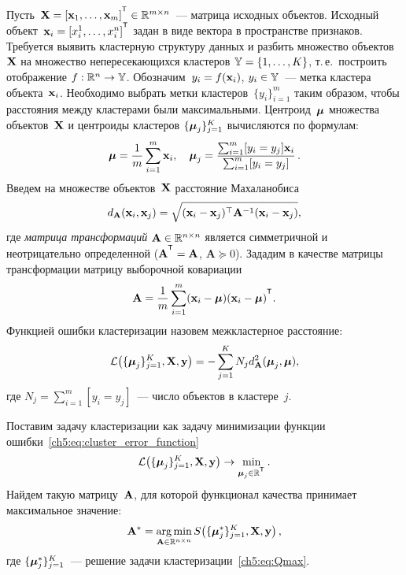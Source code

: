\documentclass[11pt, a5paper]{dissert}
\begin{document}
Пусть~$\bX = [\bx_1, \dots, \bx_m]^{\T} \in \mathbb{R}^{m \times n}$~--- матрица исходных объектов.
Исходный объект~$\bx_i = [x_i^1, \ldots, x_i^n]^{\T}$ задан в виде вектора в пространстве признаков.
Требуется выявить кластерную структуру данных и разбить множество объектов~$\mathbf{X}$ на множество непересекающихся кластеров $\mathbb{Y} = \{1, \dots, K\}$,
т.\,е.\ построить отображение $f: \mathbb{R}^n \to \mathbb{Y}$.
Обозначим~$y_i = f (\mathbf{x}_i)$, $y_i \in \mathbb{Y}$~--- метка кластера объекта~$\mathbf{x}_i$.
Необходимо выбрать метки кластеров~$\{y_i\}_{i=1}^m$ таким образом, чтобы расстояния между кластерами были максимальными.
Центроид~$\boldsymbol{\mu}$ множества объектов~$\mathbf{X}$ и центроиды кластеров $\{\boldsymbol{\mu}_j\}_{j=1}^K$ вычисляются по формулам:
\begin{equation}
	\label{ch5:eq:mu}
	\boldsymbol{\mu} =\frac{1}{m} \sum_{i=1}^m\mathbf{x}_i, \quad
	\boldsymbol{\mu}_j =\frac{ \sum_{i=1}^m [y_i = y_j]\mathbf{x}_i } {\sum_{i=1}^m [y_i = y_j]}\,.
\end{equation}
Введем на множестве объектов~$\mathbf{X}$ расстояние Махаланобиса
\begin{equation}
	d_{\mathbf{A}} (\mathbf{x}_i, \mathbf{x}_j) = \sqrt{(\mathbf{x}_i - \mathbf{x}_j)^{\top} \mathbf{A}^{-1} (\mathbf{x}_i - \mathbf{x}_j)},
	\label{ch5:eq:mahal_distance}
\end{equation}
где \textit{матрица трансформаций} $\mathbf{A} \in \mathbb{R}^{n \times n}$ является симметричной и неотрицательно определенной ($\mathbf{A}^{\T} = \mathbf{A}$, $\mathbf{A} \succeq 0$).
Зададим в качестве матрицы трансформации матрицу выборочной ковариации
\begin{equation}
	\label{ch5:eq:covMatrix}
	\bA = \frac{1}{m} \sum_{i=1}^m(\bx_i - \bmu)(\bx_i - \bmu)^{\T}.
\end{equation}
Функцией ошибки кластеризации назовем межкластерное расстояние:
\begin{equation}
	\mathcal{L} \bigl(\{\boldsymbol{\mu}_j\}_{j=1}^K, \mathbf{X}, \mathbf{y}\bigr)= - \sum_{j=1}^K N_j d_{\mathbf{A}}^2(\boldsymbol{\mu}_j, \boldsymbol{\mu}),
	\label{ch5:eq:cluster_error_function}
\end{equation}
где $N_j = \sum_{i=1}^m [y_i = y_j]$~--- число объектов в кластере~$j$.

Поставим задачу кластеризации как задачу минимизации функции ошибки~\eqref{ch5:eq:cluster_error_function}
\begin{equation}
	\label{ch5:eq:Qmax}
	\cL \bigl(\{\boldsymbol{\mu}_j\}_{j=1}^K, \bX, \by \bigr) \to \min_{\boldsymbol{\mu}_j \in \bbR^{\T}}.
\end{equation}
Найдем такую матрицу~$\mathbf{A}$, для которой функционал качества принимает максимальное значение:
\begin{equation}
	\label{ch5:eq:Amax}
	\mathbf{A}^* =\mathop{\arg \min}\limits_{\mathbf{A} \in \mathbb{R}^{n \times n}} S \bigl(\{\boldsymbol{\mu}_j^*\}_{j=1}^K, \mathbf{X}, \mathbf{y} \bigr)\,,
\end{equation}
где $\{\boldsymbol{\mu}_j^*\}_{j=1}^K$~--- решение задачи кластеризации~\eqref{ch5:eq:Qmax}.
\end{document}
